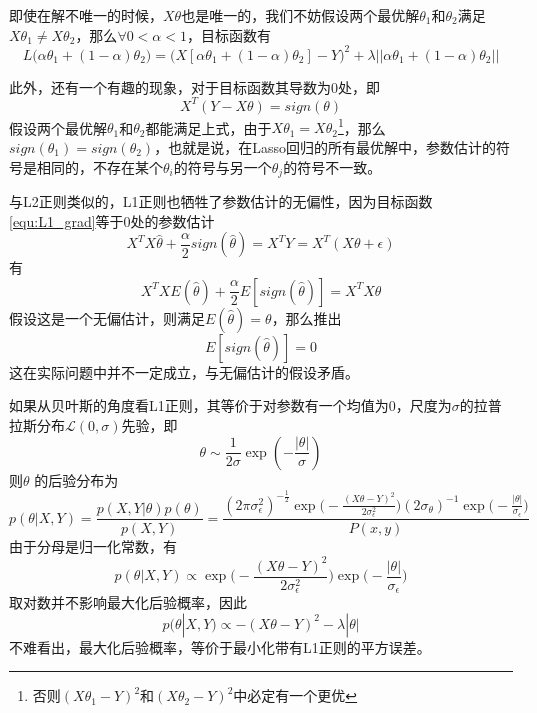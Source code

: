 即使在解不唯一的时候，$X\theta$也是唯一的，我们不妨假设两个最优解$\theta_1$和$\theta_2$满足$X\theta_1\neq X\theta_2$，那么$\forall 0 < \alpha < 1$，目标函数有
\begin{equation}
L\Big(\alpha\theta_1 + (1-\alpha)\theta_2 \Big)
= \Big(X[\alpha\theta_1 + (1-\alpha)\theta_2 ] -Y\Big)^2 
+ \lambda ||\alpha\theta_1 + (1-\alpha)\theta_2 ||
\end{equation}

此外，还有一个有趣的现象，对于目标函数其导数为0处，即
\begin{equation}
	X^T(Y - X\theta) = sign(\theta)
\end{equation}
假设两个最优解$\theta_1$和$\theta_2$都能满足上式，由于$X\theta_1 = X\theta_2$\footnote{否则$(X\theta_1 - Y)^2$和$(X\theta_2-Y)^2$中必定有一个更优}，那么$sign(\theta_1) = sign(\theta_2)$，也就是说，在Lasso回归的所有最优解中，参数估计的符号是相同的，不存在某个$\theta_i$的符号与另一个$\theta_j$的符号不一致。

与L2正则类似的，L1正则也牺牲了参数估计的无偏性，因为目标函数\ref{equ:L1_grad}等于0处的参数估计
\begin{equation}
	X^TX\hat{\theta}+\frac{\alpha}{2}sign(\hat{\theta}) = X^TY = X^T(X\theta + \epsilon)
\end{equation}
有
\begin{equation}
	X^TXE(\hat{\theta})+\frac{\alpha}{2} E[sign(\hat{\theta})] = X^TX\theta
\end{equation}
假设这是一个无偏估计，则满足$E(\hat{\theta})=\theta$，那么推出
\begin{equation}
	E[sign(\hat{\theta})] = 0 
\end{equation}
这在实际问题中并不一定成立，与无偏估计的假设矛盾。

如果从贝叶斯的角度看L1正则，其等价于对参数有一个均值为0，尺度为$\sigma$的拉普拉斯分布$\mathcal{L}(0, \sigma)$先验，即
\begin{equation}
	\theta \sim \frac{1}{2\sigma} \exp(- \frac{|\theta|}{\sigma})
\end{equation}
则$\theta$ 的后验分布为
\begin{equation}
	p(\theta|X, Y) = \frac{p(X, Y| \theta)p(\theta)}{p(X, Y)} 
	= \frac{(2\pi\sigma_\epsilon^2)^{-\frac{1}{2}}\exp\Big(-\frac{(X\theta - Y)^2}{2\sigma_\epsilon^2}\Big)
	(2\sigma_\theta)^{-1}\exp\Big(-\frac{|\theta|}{\sigma_\epsilon}\Big)
	}{P(x, y)}
\end{equation}
由于分母是归一化常数，有
\begin{equation}
p(\theta|X, Y) \propto 
\exp\Big(-\frac{(X\theta - Y)^2}{2\sigma_\epsilon^2}\Big)
\exp\Big(-\frac{|\theta|}{\sigma_\epsilon}\Big)
\end{equation}
取对数并不影响最大化后验概率，因此
\begin{equation}
	p(\theta|X, Y) \propto  -(X\theta - Y)^2 -\lambda |\theta|
\end{equation}
不难看出，最大化后验概率，等价于最小化带有L1正则的平方误差。


